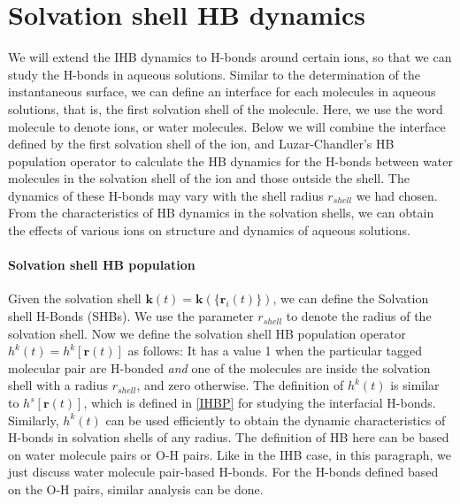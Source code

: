 %
%

\FloatBarrier
\section{Solvation shell HB dynamics} \label{PARA_SHBD}
We will extend the IHB dynamics to H-bonds around certain ions, so that we can study the H-bonds in aqueous solutions. 
Similar to the determination of the instantaneous surface, we can define an interface for each molecules in aqueous solutions, that is, 
the first solvation shell of the molecule. Here, we use the word molecule to denote ions, or water molecules.  
Below we will combine the interface defined by the first solvation shell of the ion, 
and Luzar-Chandler's HB population operator \cite{AL96} to calculate the HB
dynamics for the H-bonds between water molecules in the solvation shell of the ion and those outside the shell. 
The dynamics of these H-bonds may vary with the shell radius $r_{shell}$ we had chosen.
From the characteristics of HB dynamics in the solvation shells, we can obtain the effects of various ions on structure and dynamics of aqueous solutions. 

\paragraph{Solvation shell HB population}
Given the solvation shell ${\mathbf k}(t)={\mathbf k}(\{{\mathbf r}_i(t)\})$, we can define the Solvation shell H-Bonds (SHBs).
We use the parameter $r_{shell}$ to denote the radius of the solvation shell.
Now we define the solvation shell HB population operator $h^{k}(t) = h^{k}[{\mathbf r}(t)]$ as follows:
It has a value 1 when the particular tagged molecular pair are H-bonded \emph{and} one of the molecules are inside the solvation shell
with a radius $r_{shell}$, and zero otherwise. 
The definition of $h^{k}(t)$ is similar to $h^{s}[{\mathbf r}(t)]$, which is defined in \ref{IHBP} for studying the interfacial H-bonds.
Similarly, $h^{k}(t)$ can be used efficiently to obtain the dynamic characteristics of H-bonds in solvation shells of any radius. 
The definition of HB here can be based on water molecule pairs or O-H pairs. 
Like in the IHB case, in this paragraph, we just discuss water molecule pair-based H-bonds. 
For the H-bonds defined based on the O-H pairs, similar analysis can be done.


